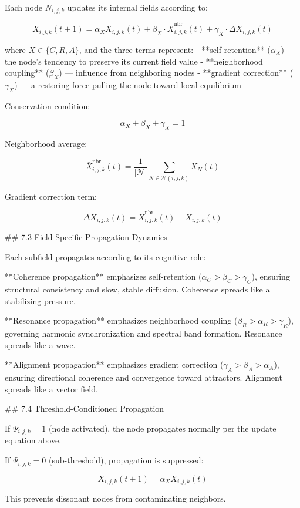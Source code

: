 Each node \(N_{i,j,k}\) updates its internal fields according to:

\[
X_{i,j,k}(t+1) = \alpha_X X_{i,j,k}(t) + \beta_X \cdot \overline{X}^{\text{nbr}}_{i,j,k}(t)
+ \gamma_X \cdot \Delta X_{i,j,k}(t)
\]

where \(X \in \{C, R, A\}\), and the three terms represent:
- **self-retention** (\(\alpha_X\)) — the node's tendency to preserve its current
  field value
- **neighborhood coupling** (\(\beta_X\)) — influence from neighboring nodes
- **gradient correction** (\(\gamma_X\)) — a restoring force pulling the node toward
  local equilibrium

Conservation condition:

\[
\alpha_X + \beta_X + \gamma_X = 1
\]

Neighborhood average:

\[
\overline{X}^{\text{nbr}}_{i,j,k}(t) = \frac{1}{|\mathcal{N}|}
\sum_{N \in \mathcal{N}(i,j,k)} X_N(t)
\]

Gradient correction term:

\[
\Delta X_{i,j,k}(t) = \overline{X}^{\text{nbr}}_{i,j,k}(t) - X_{i,j,k}(t)
\]

## 7.3 Field-Specific Propagation Dynamics

Each subfield propagates according to its cognitive role:

**Coherence propagation** emphasizes self-retention (\(\alpha_C > \beta_C > \gamma_C\)),
ensuring structural consistency and slow, stable diffusion. Coherence spreads like a
stabilizing pressure.

**Resonance propagation** emphasizes neighborhood coupling (\(\beta_R > \alpha_R >
\gamma_R\)), governing harmonic synchronization and spectral band formation.
Resonance spreads like a wave.

**Alignment propagation** emphasizes gradient correction (\(\gamma_A > \beta_A >
\alpha_A\)), ensuring directional coherence and convergence toward attractors.
Alignment spreads like a vector field.

## 7.4 Threshold-Conditioned Propagation

If \(\Psi_{i,j,k} = 1\) (node activated), the node propagates normally per the
update equation above.

If \(\Psi_{i,j,k} = 0\) (sub-threshold), propagation is suppressed:

\[
X_{i,j,k}(t+1) = \alpha_X X_{i,j,k}(t)
\]

This prevents dissonant nodes from contaminating neighbors.

